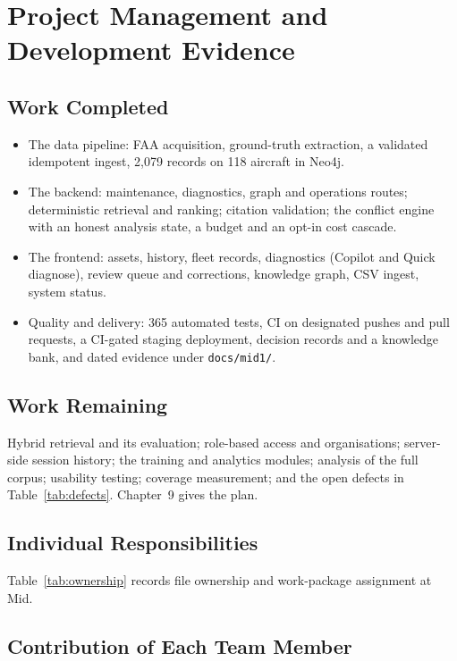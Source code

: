 \chapter{Project Management and Development Evidence}

\section{Work Completed}

\begin{itemize}
\item The data pipeline: FAA acquisition, ground-truth extraction, a validated idempotent ingest, 2{,}079 records on 118 aircraft in Neo4j.
\item The backend: maintenance, diagnostics, graph and operations routes; deterministic retrieval and ranking; citation validation; the conflict engine with an honest analysis state, a budget and an opt-in cost cascade.
\item The frontend: assets, history, fleet records, diagnostics (Copilot and Quick diagnose), review queue and corrections, knowledge graph, CSV ingest, system status.
\item Quality and delivery: 365 automated tests, CI on designated pushes and pull requests, a CI-gated staging deployment, decision records and a knowledge bank, and dated evidence under \texttt{docs/mid1/}.
\end{itemize}

\section{Work Remaining}

Hybrid retrieval and its evaluation; role-based access and organisations; server-side session history; the training and analytics modules; analysis of the full corpus; usability testing; coverage measurement; and the open defects in Table~\ref{tab:defects}. Chapter~9 gives the plan.

\section{Individual Responsibilities}

Table~\ref{tab:ownership} records file ownership and work-package assignment at Mid.



\section{Contribution of Each Team Member}

